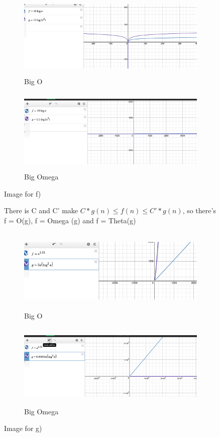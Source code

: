 \documentclass{article}
\begin{document}
\begin{enumerate}[label=(\alph*)]
\begin{figure}[h]
    \begin{subfigure}{0.5\textwidth}
    \includegraphics[width=0.9\linewidth, height=4cm]{f) big O.png}
    \caption{Big O}
    \label{fig:subim1}
    \end{subfigure}
    \begin{subfigure}{0.5\textwidth}
    \includegraphics[width=0.9\linewidth, height=4cm]{f) big omega.png}
    \caption{Big Omega}
    \label{fig:subim2}
    \end{subfigure}
    \caption{Image for f)}
    \label{fig:image2}
\end{figure}

\begin{figure}[h]
\item %
There is C and C' make $C*g(n) \le f(n) \le C'*g(n)$, so  there's f = O(g), f = Omega (g) and f = Theta(g)\\
    \begin{subfigure}{0.5\textwidth}
    \includegraphics[width=0.9\linewidth, height=4cm]{g) big O.png}
    \caption{Big O}
    \label{fig:subim1}
    \end{subfigure}
    \begin{subfigure}{0.5\textwidth}
    \includegraphics[width=0.9\linewidth, height=4cm]{g) big omega.png}
    \caption{Big Omega}
    \label{fig:subim2}
    \end{subfigure}
    \caption{Image for g)}
    \label{fig:image2}
    \end{figure}
    

\end{enumerate}
\end{document}
